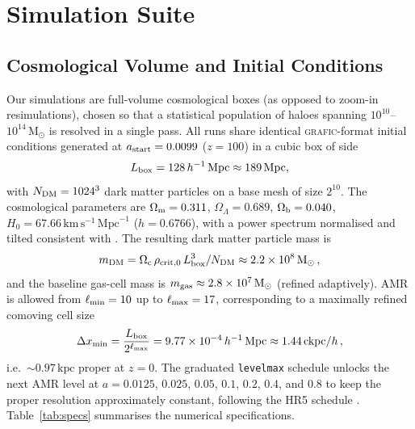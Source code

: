 \documentclass[fleqn,usenatbib]{mnras}
\newcommand{\code}[1]{\texttt{#1}}
\newcommand{\kms}{\,\mathrm{km\,s^{-1}}}
\newcommand{\Msun}{\mathrm{M_\odot}}
\newcommand{\Mpc}{\,\mathrm{Mpc}}
\newcommand{\kpc}{\,\mathrm{kpc}}
\begin{document}
\section{Simulation Suite}
\label{sec:sims}

\subsection{Cosmological Volume and Initial Conditions}
\label{sec:ics}

Our simulations are full-volume cosmological boxes (as opposed to
zoom-in resimulations), chosen so that a statistical population of
haloes spanning $10^{10}$--$10^{14}\,\Msun$ is resolved in a single
pass.  All runs share identical \textsc{grafic}-format initial
conditions generated at $a_{\rm start} = 0.0099$ ($z = 100$) in a
cubic box of side
\begin{equation}
  L_{\rm box} = 128\,h^{-1}\Mpc \approx 189\Mpc,
\end{equation}
with $N_{\rm DM} = 1024^{3}$ dark matter particles on a base
mesh of size $2^{10}$.  The cosmological parameters are
$\Omega_{\rm m} = 0.311$, $\Omega_\Lambda = 0.689$,
$\Omega_{\rm b} = 0.040$, $H_0 = 67.66\kms\Mpc^{-1}$
($h = 0.6766$), with a power spectrum normalised and tilted
consistent with \citet{Planck2020}.  The resulting dark matter
particle mass is
\begin{equation}
  m_{\rm DM} = \Omega_{\rm c}\,\rho_{\rm crit,0}\,
    L_{\rm box}^{3}/N_{\rm DM}
  \approx 2.2\times 10^{8}\,\Msun\,,
\end{equation}
and the baseline gas-cell mass is $m_{\rm gas}\approx 2.8\times
10^{7}\,\Msun$ (refined adaptively).  AMR is allowed from
$\ell_{\rm min}=10$ up to $\ell_{\rm max}=17$, corresponding to a
maximally refined comoving cell size
\begin{equation}
  \Delta x_{\rm min} = \frac{L_{\rm box}}{2^{\ell_{\rm max}}}
    = 9.77\times 10^{-4}\,h^{-1}\Mpc
    \approx 1.44\,\mathrm{ckpc}/h\,,
\end{equation}
i.e.\ $\sim 0.97\kpc$ proper at $z = 0$.  The graduated
\code{levelmax} schedule unlocks the next AMR level at $a =
0.0125$, $0.025$, $0.05$, $0.1$, $0.2$, $0.4$, and $0.8$ to keep the
proper resolution approximately constant, following the HR5
schedule \citep{Lee2021}.  Table~\ref{tab:specs} summarises the
numerical specifications.
\end{document}
